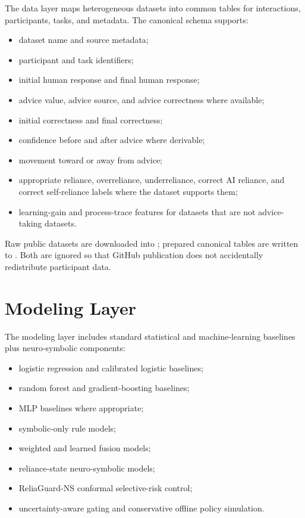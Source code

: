 \documentclass[11pt]{article}
\begin{document}
The data layer maps heterogeneous datasets into common tables for interactions, participants, tasks, and metadata. The canonical schema supports:

\begin{itemize}[leftmargin=*]
  \item dataset name and source metadata;
  \item participant and task identifiers;
  \item initial human response and final human response;
  \item advice value, advice source, and advice correctness where available;
  \item initial correctness and final correctness;
  \item confidence before and after advice where derivable;
  \item movement toward or away from advice;
  \item appropriate reliance, overreliance, underreliance, correct AI reliance, and correct self-reliance labels where the dataset supports them;
  \item learning-gain and process-trace features for datasets that are not advice-taking datasets.
\end{itemize}

Raw public datasets are downloaded into ; prepared canonical tables are written to . Both are ignored so that GitHub publication does not accidentally redistribute participant data.

\section*{Modeling Layer}

The modeling layer includes standard statistical and machine-learning baselines plus neuro-symbolic components:

\begin{itemize}[leftmargin=*]
  \item logistic regression and calibrated logistic baselines;
  \item random forest and gradient-boosting baselines;
  \item MLP baselines where appropriate;
  \item symbolic-only rule models;
  \item weighted and learned fusion models;
  \item reliance-state neuro-symbolic models;
  \item ReliaGuard-NS conformal selective-risk control;
  \item uncertainty-aware gating and conservative offline policy simulation.
\end{itemize}
\end{document}
